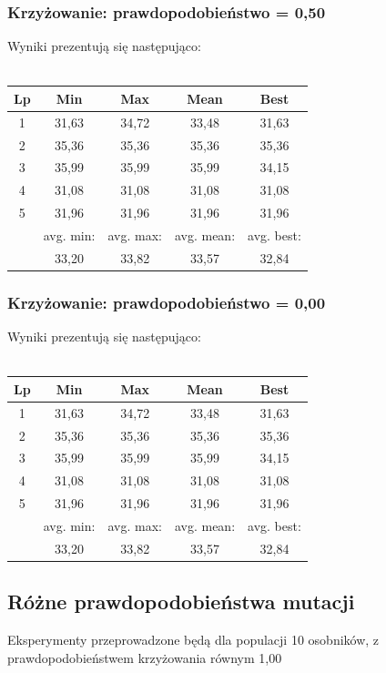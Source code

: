\documentclass[a4paper,11pt]{article}
\begin{document}
				\subsubsection{Krzyżowanie: prawdopodobieństwo = 0,50}
					Wyniki prezentują się następująco:\\~\\
					\begin{tabular}{|c|c|c|c|c|}
						\hline 
						Lp & Min & Max & Mean & Best \\
						\hline
						1 & 31,63  & 34,72 & 33,48 & 31,63\\\hline
						2 & 35,36 & 35,36  &35,36 & 35,36 \\\hline
						3 & 35,99 & 35,99  & 35,99 &34,15 \\\hline
						4 & 31,08 & 31,08  & 31,08& 31,08 \\\hline
						5 & 31,96 & 31,96  & 31,96 & 31,96\\\hline
						&avg. min:&avg. max:&avg. mean:&avg. best:\\\hline
						& 33,20 & 33,82& 33,57 &32,84\\\hline
					\end{tabular} 
				\subsubsection{Krzyżowanie: prawdopodobieństwo = 0,00}
					Wyniki prezentują się następująco:\\~\\
					\begin{tabular}{|c|c|c|c|c|}
						\hline 
						Lp & Min & Max & Mean & Best \\
						\hline
						1 & 31,63  & 34,72 & 33,48 & 31,63\\\hline
						2 & 35,36 & 35,36  &35,36 & 35,36 \\\hline
						3 & 35,99 & 35,99  & 35,99 &34,15 \\\hline
						4 & 31,08 & 31,08  & 31,08& 31,08 \\\hline
						5 & 31,96 & 31,96  & 31,96 & 31,96\\\hline
						&avg. min:&avg. max:&avg. mean:&avg. best:\\\hline
						& 33,20 & 33,82& 33,57 &32,84\\\hline
					\end{tabular} 
			\subsection{Różne prawdopodobieństwa mutacji}
				Eksperymenty przeprowadzone będą dla populacji 10 osobników, z prawdopodobieństwem krzyżowania równym 1,00
\end{document}
